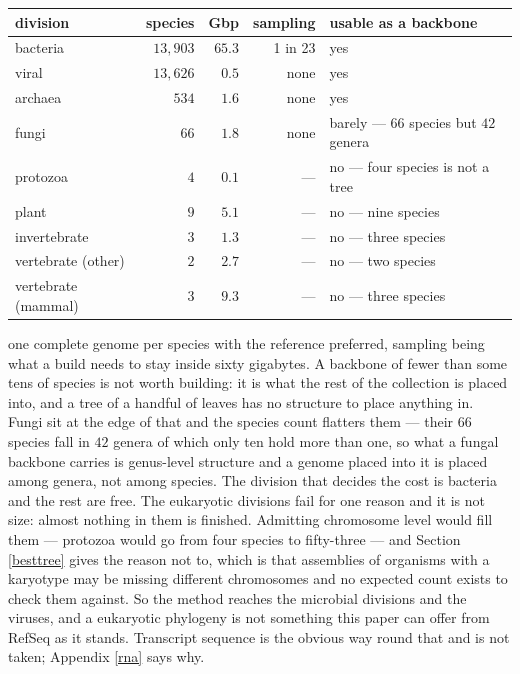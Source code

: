 \documentclass[pdflatex,sn-vancouver-num]{sn-jnl}
\begin{document}
\begin{center}\footnotesize
\begin{tabular}{@{}l|r|r|r|l@{}}
 \textbf{division} & \textbf{species} & \textbf{Gbp} & \textbf{sampling} & \textbf{usable as a backbone}\\
 \hline
 bacteria             & $13{,}903$ & $65.3$ & 1 in 23 & yes\\
 viral                & $13{,}626$ & $0.5$  & none    & yes\\
 archaea              & $534$      & $1.6$  & none    & yes\\
 fungi                & $66$       & $1.8$  & none    & barely --- $66$ species but $42$ genera\\
 \hline
 protozoa             & $4$        & $0.1$  & ---     & no --- four species is not a tree\\
 plant                & $9$        & $5.1$  & ---     & no --- nine species\\
 invertebrate         & $3$        & $1.3$  & ---     & no --- three species\\
 vertebrate (other)   & $2$        & $2.7$  & ---     & no --- two species\\
 vertebrate (mammal)  & $3$        & $9.3$  & ---     & no --- three species\\
\end{tabular}
\end{center}

\noindent
one complete genome per species with the reference preferred, sampling being what a build needs to
stay inside sixty gigabytes. A backbone of fewer than some tens of species is not worth building: it
is what the rest of the collection is placed into, and a tree of a handful of leaves has no structure
to place anything in. Fungi sit at the edge of that and the species count flatters them --- their
$66$ species fall in $42$ genera of which only ten hold more than one, so what a fungal backbone
carries is genus-level structure and a genome placed into it is placed among genera, not among
species. The division that decides the cost is bacteria and the rest are free.
The eukaryotic divisions fail for one reason and it is not size: almost nothing in them is finished.
Admitting chromosome level would fill them --- protozoa would go from four species to fifty-three ---
and Section \ref{besttree} gives the reason not to, which is that assemblies of organisms with a
karyotype may be missing different chromosomes and no expected count exists to check them against.
So the method reaches the microbial divisions and the viruses, and a eukaryotic phylogeny is not
something this paper can offer from RefSeq as it stands. Transcript sequence is the obvious way round
that and is not taken; Appendix \ref{rna} says why.
\end{document}
